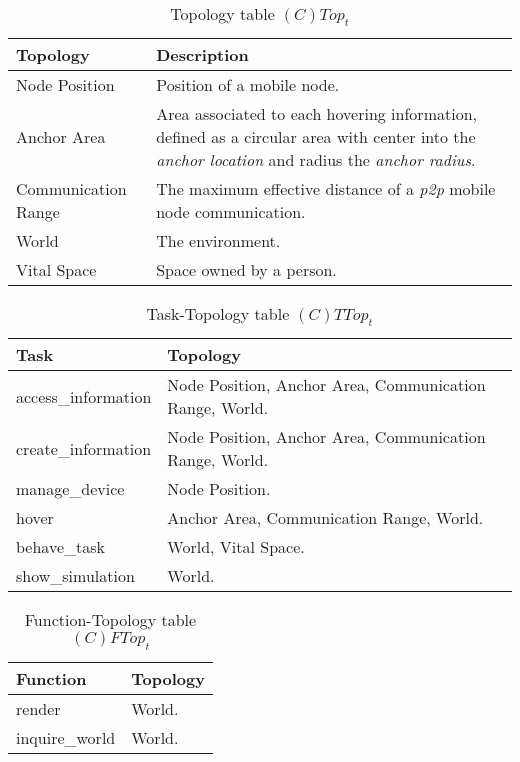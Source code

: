 \begin{table}[H]
	\centering
	\begin{tabular}{|p{4cm}|p{8cm}|}
			\hline
			\textbf{Topology} & \textbf{Description} \\
			\hline
			Node Position & Position of a mobile node. \\
			\hline
			Anchor Area & Area associated to each hovering information, defined as a
			circular area with center into the \emph{anchor location} and radius the
			\emph{anchor radius}.\\
			\hline
			Communication Range & The maximum effective distance of a \emph{p2p}
			mobile node communication. \\
			\hline
			World & The environment. \\
			\hline
			Vital Space & Space owned by a person. \\
			\hline
		\end{tabular}
	\caption{Topology table $(C)Top_t$}
	\label{tab:ctopt}
\end{table}

\begin{table}[H]
	\centering
	\begin{tabular}{|p{4cm}|p{8cm}|}
			\hline
			\textbf{Task} & \textbf{Topology} \\
			\hline
			access\_information& Node Position, Anchor Area, Communication Range, World.\\
			\hline
			create\_information & Node Position, Anchor Area, Communication Range, World.\\
			\hline
			manage\_device & Node Position. \\	
			\hline
			hover & Anchor Area, Communication Range, World. \\
			\hline
			behave\_task & World, Vital Space. \\
			\hline
			show\_simulation & World. \\
			\hline
		\end{tabular}
		\caption{Task-Topology table $(C)TTop_t$}
	\label{tab:cttopt}
\end{table}

\begin{table}[H]
	\centering
	\begin{tabular}{|p{4cm}|p{8cm}|}
			\hline
			\textbf{Function} & \textbf{Topology} \\
			\hline
			render & World.\\
			\hline
			inquire\_world & World.\\
			\hline
		\end{tabular}
	\caption{Function-Topology table $(C)FTop_t$}
	\label{tab:cftopt}
\end{table}


